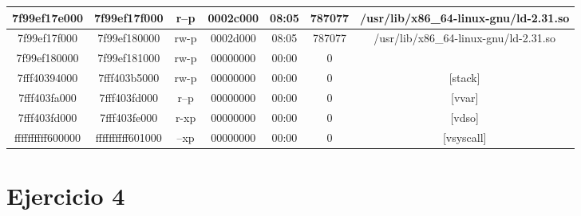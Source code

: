 \documentclass[a4paper]{article}
\begin{document}
\begin{center}
\begin{tabular}{ | c | c | c | c | c | c | c | }
7f99ef17e000 & 7f99ef17f000 & r--p & 0002c000 & 08:05 & 787077 & /usr/lib/x86\_64-linux-gnu/ld-2.31.so \\ \hline
7f99ef17f000 & 7f99ef180000 & rw-p & 0002d000 & 08:05 & 787077 & /usr/lib/x86\_64-linux-gnu/ld-2.31.so \\ \hline
7f99ef180000 & 7f99ef181000 & rw-p & 00000000 & 00:00 & 0 &  \\ \hline
7fff40394000 & 7fff403b5000 & rw-p & 00000000 & 00:00 & 0 & [stack] \\ \hline
7fff403fa000 & 7fff403fd000 & r--p & 00000000 & 00:00 & 0 & [vvar] \\ \hline
7fff403fd000 & 7fff403fe000 & r-xp & 00000000 & 00:00 & 0 & [vdso] \\ \hline
ffffffffff600000 & ffffffffff601000 & --xp & 00000000 & 00:00 & 0 & [vsyscall] \\ \hline
\end{tabular}
\end{center}

\section{Ejercicio 4}
\end{document}
